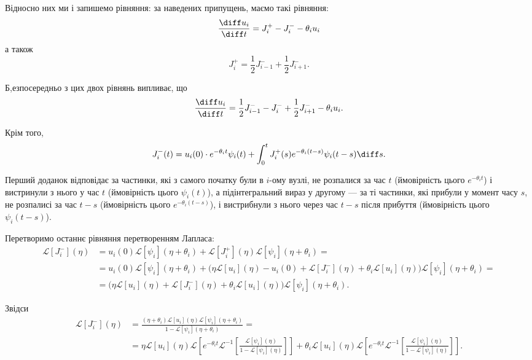 Відносно них ми і запишемо рівняння: за наведених припущень, маємо такі рівняння:
\begin{equation}
    \frac{\diff u_i}{\diff t} = J_i^+ - J_i^- - \theta_i u_i
\end{equation}
а також
\begin{equation}
    J_i^+ = \frac{1}{2} J_{i - 1}^- + \frac{1}{2} J_{i + 1}^-.
\end{equation}

Б,езпосередньо з цих двох рівнянь випливає, що
\begin{equation}
    \frac{\diff u_i}{\diff t} = \frac{1}{2} J_{i - 1}^- - J_i^- + \frac{1}{2} J_{i + 1}^- - \theta_i u_i.
\end{equation}

Крім того,
\begin{equation}
    J_i^-(t) = u_i(0) \cdot e^{-\theta_i t} \psi_i(t) + \int_0^t J_i^+(s) e^{-\theta_i (t - s)} \psi_i(t - s) \diff s.
\end{equation}

Перший доданок відповідає за частинки, які з самого початку були в $i$-ому вузлі, не розпалися за час $t$ (ймовірність цього $e^{-\theta_i t}$) і вистринули з нього у час $t$ (ймовірність цього $\psi_i(t)$), а підінтегральний вираз у другому --- за  ті частинки, які прибули у момент часу $s$, не розпалисі за час $t - s$ (ймовірність цього $e^{-\theta_i (t - s)}$), і вистрибнули з нього через час $t - s$ після прибуття (ймовірність цього $\psi_i(t - s)$). \medskip

Перетворимо останнє рівняння перетворенням Лапласа:
\begin{equation}
    \begin{aligned}
        \mathcal{L} [J_i^-](\eta)
        &= u_i(0) \mathcal{L}[\psi_i](\eta + \theta_i) + \mathcal{L} [J_i^+](\eta) \mathcal{L}[\psi_i](\eta + \theta_i) = \\
        &= u_i(0) \mathcal{L}[\psi_i](\eta + \theta_i) + \big( \eta \mathcal{L} [u_i](\eta) - u_i(0) + \mathcal{L}[J_i^-](\eta) + \theta_i \mathcal{L}[u_i](\eta) \big) \mathcal{L}[\psi_i](\eta + \theta_i) = \\
        &= \big( \eta \mathcal{L} [u_i](\eta) + \mathcal{L}[J_i^-](\eta) + \theta_i \mathcal{L}[u_i](\eta) \big) \mathcal{L}[\psi_i](\eta + \theta_i).
    \end{aligned}
\end{equation}

Звідси
\begin{equation}
    \begin{aligned}
        \mathcal{L} [J_i^-](\eta)
        &= \frac{(\eta + \theta_i) \mathcal{L} [u_i](\eta) \mathcal{L}[\psi_i](\eta + \theta_i)}{1 - \mathcal{L} [\psi_i](\eta + \theta_i)} = \\
        &= \eta \mathcal{L} [u_i](\eta) \mathcal{L} \left[ e^{-\theta_i t} \mathcal{L}^{-1} \left[ \frac{\mathcal{L}[\psi_i](\eta)}{1 - \mathcal{L}[\psi_i](\eta)} \right] \right] + \theta_i \mathcal{L} [u_i](\eta) \mathcal{L} \left[ e^{-\theta_i t} \mathcal{L}^{-1} \left[ \frac{\mathcal{L}[\psi_i](\eta)}{1 - \mathcal{L}[\psi_i](\eta)} \right] \right].
    \end{aligned}
\end{equation}

